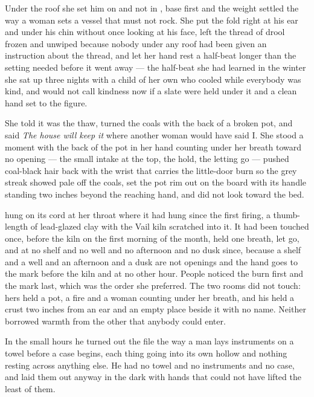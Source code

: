 \scenebreak

Under the roof she set him on  and not in , base first and the weight settled the way a woman sets a vessel that must not rock. She put the fold right at his ear and under his chin without once looking at his face, left the thread of drool frozen and unwiped because nobody under any roof had been given an instruction about the thread, and let her hand rest a half-beat longer than the setting needed before it went away --- the half-beat she had learned in the winter she sat up three nights with a child of her own who cooled while everybody was kind, and would not call kindness now if a slate were held under it and a clean hand set to the figure.

She told  it was the thaw, turned the coals with the back of a broken pot, and said \emph{The house will keep it} where another woman would have said I. She stood a moment with the back of the pot in her hand counting under her breath toward no opening --- the small intake at the top, the hold, the letting go --- pushed coal-black hair back with the wrist that carries the little-door burn so the grey streak showed pale off the coals, set the pot rim out on the board with its handle standing two inches beyond the reaching hand, and did not look toward the bed.

 hung on its cord at her throat where it had hung since the first firing, a thumb-length of lead-glazed clay with the Vail kiln scratched into it. It had been touched once, before the kiln on the first morning of the month, held one breath, let go, and at no shelf and no well and no afternoon and no dusk since, because a shelf and a well and an afternoon and a dusk are not openings and the hand goes to the mark before the kiln and at no other hour. People noticed the burn first and the mark last, which was the order she preferred. The two rooms did not touch: hers held a pot, a fire and a woman counting under her breath, and his held a crust two inches from an ear and an empty place beside it with no name. Neither borrowed warmth from the other that anybody could enter.

In the small hours he turned out the file the way a man lays instruments on a towel before a case begins, each thing going into its own hollow and nothing resting across anything else. He had no towel and no instruments and no case, and laid them out anyway in the dark with hands that could not have lifted the least of them.

